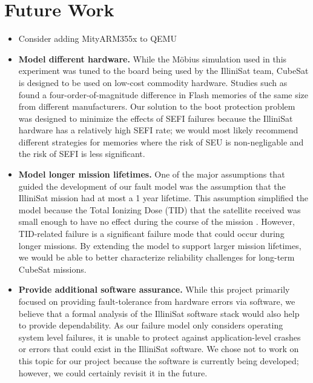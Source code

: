 \section{Future Work}\label{sec:future_work}
\begin{itemize}
  \item Consider adding MityARM355x to QEMU
  \item {\bf Model different hardware.}  While the M\"obius simulation used in this experiment was tuned to the board being used by the IlliniSat team, CubeSat is designed to be used on low-cost commodity hardware.  Studies such as \cite{Oldham2008TID} found a four-order-of-magnitude difference in Flash memories of the same size from different manufacturers.  Our solution to the boot protection problem was designed to minimize the effects of SEFI failures because the IlliniSat hardware has a relatively high SEFI rate; we would most likely recommend different strategies for memories where the risk of SEU is non-negligable and the risk of SEFI is less significant.
  \item {\bf Model longer mission lifetimes.}  One of the major assumptions that guided the development of our fault model was the assumption that the IlliniSat mission had at most a 1 year lifetime.  This assumption simplified the model because the Total Ionizing Dose (TID) that the satellite received was small enough to have no effect during the course of the mission \cite{Likar2010Novel, Oldham2008TID}.  However, TID-related failure is a significant failure mode that could occur during longer missions.  By extending the model to support larger mission lifetimes, we would be able to better characterize reliability challenges for long-term CubeSat missions.
  \item {\bf Provide additional software assurance.} While this project primarily focused on providing fault-tolerance from hardware errors via software, we believe that a formal analysis of the IlliniSat software stack would also help to provide dependability.  As our failure model only considers operating system level failures, it is unable to protect against application-level crashes or errors that could exist in the IlliniSat software.  We chose not to work on this topic for our project because the software is currently being developed; however, we could certainly revisit it in the future.
\end{itemize}
